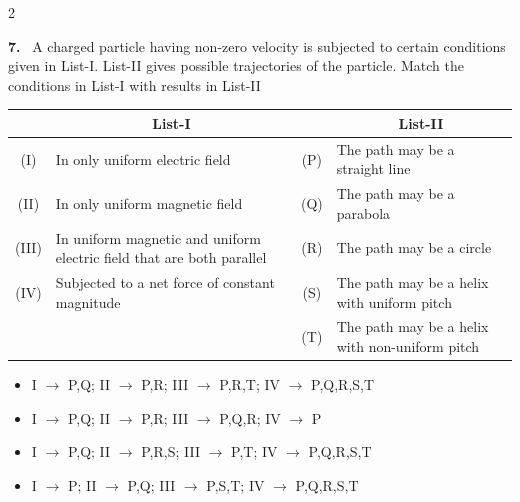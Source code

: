 \documentclass[10pt]{extarticle}
\newcommand{\qn}[1]{\par\smallskip\noindent\textbf{#1.}~}
\newenvironment{qoptions}{\begin{itemize}[leftmargin=1.8em,itemsep=1pt,topsep=2pt,label={}]}{\end{itemize}}
\newcommand{\opt}[2]{\item[(#1)] #2}
\begin{document}
\begin{multicols}{2}
\qn{7} A charged particle having non-zero velocity is subjected to certain conditions given in List-I. List-II gives possible trajectories of the particle. Match the conditions in List-I with results in List-II\par\nobreak
\begin{center}\small\setlength{\tabcolsep}{3pt}
\begin{tabular}{|c|p{3.0cm}|c|p{2.8cm}|}
\hline
 & \multicolumn{1}{c|}{\textbf{List-I}} & & \multicolumn{1}{c|}{\textbf{List-II}} \\
\hline
(I) & In only uniform electric field & (P) & The path may be a straight line \\
\hline
(II) & In only uniform magnetic field & (Q) & The path may be a parabola \\
\hline
(III) & In uniform magnetic and uniform electric field that are both parallel & (R) & The path may be a circle \\
\hline
(IV) & Subjected to a net force of constant magnitude & (S) & The path may be a helix with uniform pitch \\
\hline
 & & (T) & The path may be a helix with non-uniform pitch \\
\hline
\end{tabular}
\end{center}
\begin{qoptions}
\opt{A}{I $\to$ P,Q; II $\to$ P,R; III $\to$ P,R,T; IV $\to$ P,Q,R,S,T}
\opt{B}{I $\to$ P,Q; II $\to$ P,R; III $\to$ P,Q,R; IV $\to$ P}
\opt{C}{I $\to$ P,Q; II $\to$ P,R,S; III $\to$ P,T; IV $\to$ P,Q,R,S,T}
\opt{D}{I $\to$ P; II $\to$ P,Q; III $\to$ P,S,T; IV $\to$ P,Q,R,S,T}
\end{qoptions}


\end{multicols}
\end{document}
